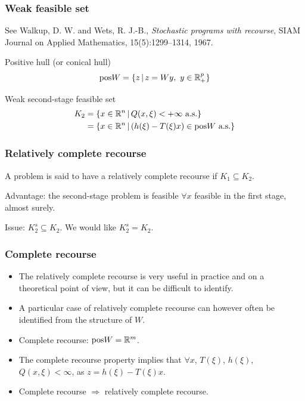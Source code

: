 \documentclass{beamer}
\begin{document}
\begin{frame}
\frametitle{Weak feasible set}

See Walkup, D. W. and Wets, R. J.-B., {\it Stochastic programs with recourse}, SIAM Journal on Applied Mathematics, 15(5):1299--1314, 1967.

\mbox{}

{\red Positive hull} (or conical hull)
$$
\text{pos}W = \lbrace z \,|\, z = Wy,\ y \in {\mathbb{R}}^p_+ \rbrace
$$

\mbox{}

{\red Weak second-stage feasible set}
\begin{align*}
K_2 &= \lbrace x \in {\mathbb{R}}^n \,|\, Q(x,\xi) < +\infty \text{ a.s.} \rbrace \\
&= \lbrace x \in {\mathbb{R}}^n \,|\, (h(\xi) - T(\xi)x) \in \text{pos} W \text{ a.s.} \rbrace
\end{align*}

\end{frame}

\begin{frame}
\frametitle{Relatively complete recourse}

A problem is said to have a {\red relatively complete recourse} if $K_1
\subseteq K_2$.

\mbox{}

{\blue Advantage}: the second-stage problem is feasible $\forall x$ feasible in the first stage, almost surely.

\mbox{}

{\blue Issue}: $K_2^s \subseteq K_2$. We would like $K_2^s = K_2$.

\end{frame}

\begin{frame}
\frametitle{Complete recourse}
	
\begin{itemize}
	\item 
	The relatively complete recourse is very useful in practice and on a theoretical point of view, but it can be difficult to identify.
	\item 
	A particular case of relatively complete recourse can however often be identified from the structure of $W$.
\item
	{\red Complete recourse}: $\text{pos}W = {\mathbb{R}}^m$.
\item
	The complete recourse property implies that $\forall x$, $T(\xi)$, $h(\xi)$, $Q(x,\xi) < \infty$, as $z = h(\xi)-T(\xi)x$.
	\item
	Complete recourse $\Rightarrow$ relatively complete recourse.
\end{itemize}

\end{frame}
\end{document}
